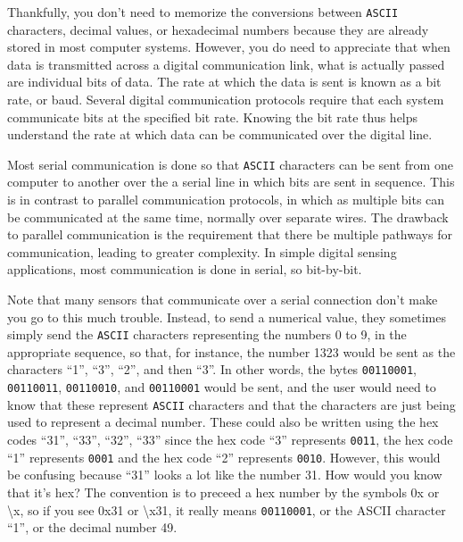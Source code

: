 Thankfully, you don’t need to memorize the conversions between \texttt{ASCII} characters, decimal values, or hexadecimal numbers because they are already stored in most computer systems.
However, you do need to appreciate that when data is transmitted across a digital communication link, what is actually passed are individual bits of data. 
The rate at which the data is sent is known as a bit rate, or baud.  
Several digital communication protocols require that each system communicate bits at the specified bit rate. 
Knowing the bit rate thus helps understand the rate at which data can be communicated over the digital line. 

Most serial communication is done so that \texttt{ASCII} characters can be sent from one computer to another over the a serial line in which bits are sent in sequence. 
This is in contrast to parallel communication protocols, in which as multiple bits can be communicated at the same time, normally over separate wires.
The drawback to parallel communication is the requirement that there be multiple pathways for communication, leading to greater complexity.
In simple digital sensing applications, most communication is done in serial, so bit-by-bit.


Note that many sensors that communicate over a serial connection don’t make you go to this much trouble.
Instead, to send a numerical value, they sometimes simply send the \texttt{ASCII} characters representing the numbers 0 to 9, in the appropriate sequence, so that, for instance, the number 1323 would be sent as the characters “1”, “3”, “2”, and then “3”.
In other words, the bytes \texttt{00110001}, \texttt{00110011}, \texttt{00110010}, and \texttt{00110001} would be sent, and the user would need to know that these represent \texttt{ASCII} characters and that the characters are just being used to represent a decimal number.
These could also be written using the hex codes “31”, “33”, “32”, “33” since the hex code “3” represents \texttt{0011}, the hex code “1” represents \texttt{0001} and the hex code “2” represents  \texttt{0010}.  
However, this would be confusing because “31” looks a lot like the number 31.
How would you know that it’s hex?
The convention is to preceed a hex number by the symbols 0x or \textbackslash x, so if you see 0x31 or \textbackslash x31, it really means \texttt{00110001}, or the ASCII character “1”, or the decimal number 49.  

